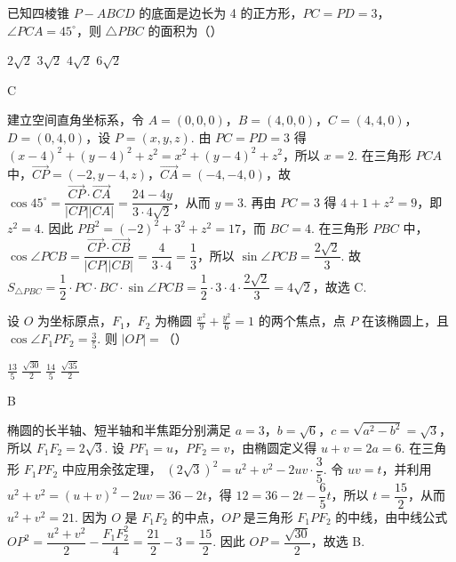 \begin{problem}
已知四棱锥 \( P-ABCD \) 的底面是边长为 4 的正方形，\( PC=PD=3 \)，\( \angle PCA=45^\circ \)，则 \( \triangle PBC \) 的面积为（\quad）

\choices
    {\(2\sqrt{2}\)}
    {\(3\sqrt{2}\)}
    {\(4\sqrt{2}\)}
    {\(6\sqrt{2}\)}
\end{problem}

\begin{answer}
C
\end{answer}

\begin{solution}
建立空间直角坐标系，令 \(A=(0,0,0)\)，\(B=(4,0,0)\)，\(C=(4,4,0)\)，\(D=(0,4,0)\)，设 \(P=(x,y,z)\). 由 \(PC=PD=3\) 得
\((x-4)^2+(y-4)^2+z^2=x^2+(y-4)^2+z^2\)，所以 \(x=2\). 在三角形 \(PCA\) 中，\(\overrightarrow{CP}=(-2,y-4,z)\)，\(\overrightarrow{CA}=(-4,-4,0)\)，故
\(\cos45^\circ=\dfrac{\overrightarrow{CP}\cdot\overrightarrow{CA}}{\lvert CP\rvert\lvert CA\rvert}=\dfrac{24-4y}{3\cdot4\sqrt2}\)，从而 \(y=3\). 再由 \(PC=3\) 得 \(4+1+z^2=9\)，即 \(z^2=4\). 因此
\(PB^2=(-2)^2+3^2+z^2=17\)，而 \(BC=4\). 在三角形 \(PBC\) 中，
\(\cos\angle PCB=\dfrac{\overrightarrow{CP}\cdot\overrightarrow{CB}}{\lvert CP\rvert\lvert CB\rvert}=\dfrac{4}{3\cdot4}=\dfrac13\)，所以 \(\sin\angle PCB=\dfrac{2\sqrt2}{3}\). 故
\(S_{\triangle PBC}=\dfrac12\cdot PC\cdot BC\cdot\sin\angle PCB=\dfrac12\cdot3\cdot4\cdot\dfrac{2\sqrt2}{3}=4\sqrt2\)，故选 C.
\end{solution}

\begin{problem}
设 \(O\) 为坐标原点，\(F_1\)，\(F_2\) 为椭圆 \( \frac{x^2}{9}+\frac{y^2}{6}=1 \) 的两个焦点，点 \(P\) 在该椭圆上，且 \( \cos\angle F_1PF_2=\frac35 \). 则 \( \lvert OP \rvert= \)（\quad）

\choices
    {\(\frac{13}{5}\)}
    {\(\frac{\sqrt{30}}{2}\)}
    {\(\frac{14}{5}\)}
    {\(\frac{\sqrt{35}}{2}\)}
\end{problem}

\begin{answer}
B
\end{answer}

\begin{solution}
椭圆的长半轴、短半轴和半焦距分别满足 \(a=3\)，\(b=\sqrt6\)，\(c=\sqrt{a^2-b^2}=\sqrt3\)，所以 \(F_1F_2=2\sqrt3\). 设 \(PF_1=u\)，\(PF_2=v\)，由椭圆定义得 \(u+v=2a=6\). 在三角形 \(F_1PF_2\) 中应用余弦定理，
\((2\sqrt3)^2=u^2+v^2-2uv\cdot\dfrac35\). 令 \(uv=t\)，并利用 \(u^2+v^2=(u+v)^2-2uv=36-2t\)，得
\(12=36-2t-\dfrac65t\)，所以 \(t=\dfrac{15}{2}\)，从而 \(u^2+v^2=21\). 因为 \(O\) 是 \(F_1F_2\) 的中点，\(OP\) 是三角形 \(F_1PF_2\) 的中线，由中线公式
\(OP^2=\dfrac{u^2+v^2}{2}-\dfrac{F_1F_2^2}{4}=\dfrac{21}{2}-3=\dfrac{15}{2}\). 因此 \(OP=\dfrac{\sqrt{30}}{2}\)，故选 B.
\end{solution}

